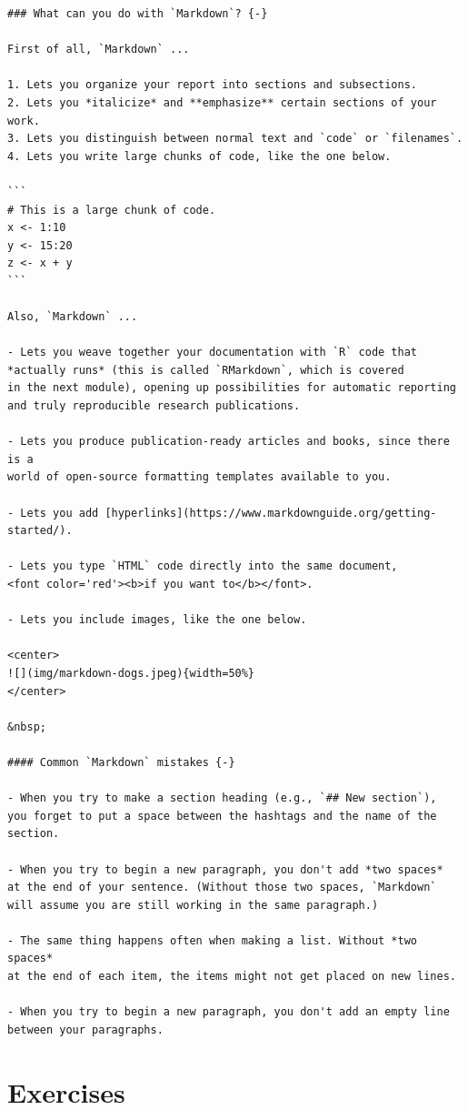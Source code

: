 \documentclass[
]{book}
\begin{document}
\begin{verbatim}
### What can you do with `Markdown`? {-}  

First of all, `Markdown` ...  

1. Lets you organize your report into sections and subsections.  
2. Lets you *italicize* and **emphasize** certain sections of your work. 
3. Lets you distinguish between normal text and `code` or `filenames`. 
4. Lets you write large chunks of code, like the one below. 

```
# This is a large chunk of code. 
x <- 1:10
y <- 15:20
z <- x + y
```

Also, `Markdown` ...  

- Lets you weave together your documentation with `R` code that
*actually runs* (this is called `RMarkdown`, which is covered
in the next module), opening up possibilities for automatic reporting
and truly reproducible research publications.  

- Lets you produce publication-ready articles and books, since there is a
world of open-source formatting templates available to you.  

- Lets you add [hyperlinks](https://www.markdownguide.org/getting-started/).  

- Lets you type `HTML` code directly into the same document, 
<font color='red'><b>if you want to</b></font>. 

- Lets you include images, like the one below.  

<center>
![](img/markdown-dogs.jpeg){width=50%}
</center>

&nbsp;  

#### Common `Markdown` mistakes {-}

- When you try to make a section heading (e.g., `## New section`),
you forget to put a space between the hashtags and the name of the section.  

- When you try to begin a new paragraph, you don't add *two spaces*
at the end of your sentence. (Without those two spaces, `Markdown`
will assume you are still working in the same paragraph.) 

- The same thing happens often when making a list. Without *two spaces*
at the end of each item, the items might not get placed on new lines.  

- When you try to begin a new paragraph, you don't add an empty line
between your paragraphs.  
\end{verbatim}

\hypertarget{exercises-7}{%
\section*{Exercises}\label{exercises-7}}
\end{document}
